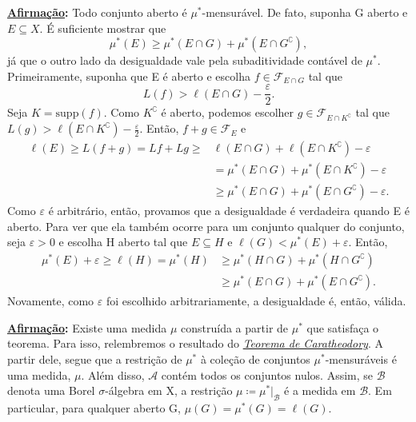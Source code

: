 \documentclass[measure_theory.tex]{subfiles}
\begin{document}
\begin{proof*}
	\textbf{\underline{Afirmação}:} Todo conjunto aberto é \(\mu^{*} \)-mensurável.
	De fato, suponha G aberto e \(E\subseteq X.\) É suficiente mostrar que
	\[
		\mu ^{*}(E) \geq \mu ^{*}(E\cap G) + \mu ^{*}(E\cap G ^{\complement}),
	\]
	já que o outro lado da desigualdade vale pela subaditividade contável de \(\mu ^{*}\). Primeiramente, suponha que E é aberto e escolha \(f\in \mathcal{F}_{E\cap G}\) tal que
	\[
		L(f) > \ell (E\cap G) - \frac{\varepsilon }{2}.
	\]
	Seja \(K = \mathrm{supp}(f).\) Como \(K ^{\complement}\) é aberto, podemos escolher \(g\in \mathcal{F}_{E\cap K ^{\complement}}\) tal que \(L(g) > \ell (E\cap K ^{\complement}) - \frac{\varepsilon }{2}.\) Então, \(f+ g\in \mathcal{F}_{E}\) e
	\begin{align*}
		\ell (E) \geq L(f+g) = Lf + Lg \geq & \ell (E\cap G) + \ell (E\cap K ^{\complement}) - \varepsilon             \\
		                                    & = \mu ^{*}(E\cap G) + \mu ^{*}(E\cap K ^{\complement}) - \varepsilon     \\
		                                    & \geq \mu^{*}(E\cap G) + \mu ^{*}(E\cap G ^{\complement}) - \varepsilon .
	\end{align*}
	Como \(\varepsilon \) é arbitrário, então, provamos que a desigualdade é verdadeira quando E é aberto. Para ver que ela também ocorre para um conjunto qualquer do conjunto, seja \(\varepsilon > 0\) e
	escolha H aberto tal que \(E\subseteq H\) e \(\ell (G) < \mu ^{*}(E) + \varepsilon .\) Então,
	\begin{align*}
		\mu ^{*}(E) + \varepsilon \geq \ell (H) = \mu ^{*}(H) & \geq \mu ^{*}(H\cap G) + \mu ^{*}(H\cap G ^{\complement})  \\
		                                                      & \geq \mu ^{*}(E\cap G) + \mu ^{*}(E\cap G ^{\complement}).
	\end{align*}
	Novamente, como \(\varepsilon \) foi escolhido arbitrariamente, a desigualdade é, então, válida.

	\textbf{\underline{Afirmação}:} Existe uma medida \(\mu \) construída a partir de \(\mu ^{*}\) que satisfaça o teorema.
	Para isso, relembremos o resultado do \hyperlink{caratheodory}{\textit{Teorema de Caratheodory}}. A partir dele, segue que
	a restrição de \(\mu ^{*}\) à coleção de conjuntos \(\mu ^{*}\)-mensuráveis é uma medida, \(\mu \). Além disso, \(\mathcal{A}\) contém todos os conjuntos nulos.
	Assim, se \(\mathcal{B}\) denota uma Borel \(\sigma \)-álgebra em X, a restrição \(\mu \coloneqq \mu ^{*}|_{\mathcal{B}}\) é a medida em \(\mathcal{B}\). Em particular,
	para qualquer aberto G, \(\mu (G) = \mu ^{*}(G) = \ell (G).\) \qedsymbol


\end{proof*}
\end{document}
